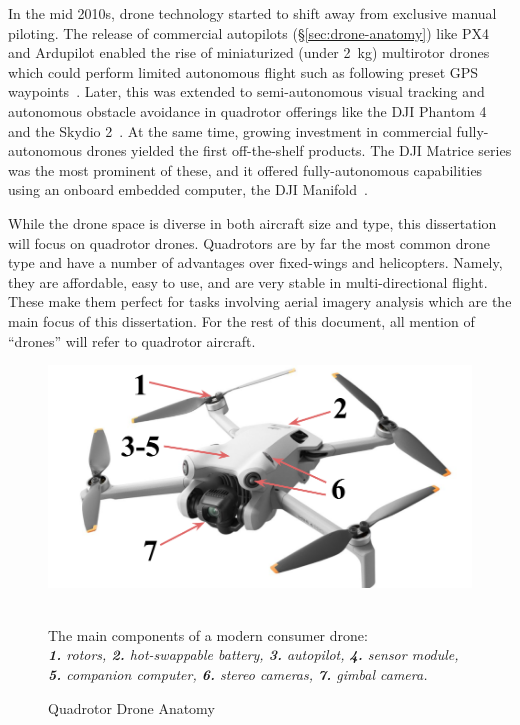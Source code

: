 In the mid 2010s, drone technology started to shift away from exclusive manual piloting. The release of commercial autopilots (\S\ref{sec:drone-anatomy}) like PX4 and Ardupilot enabled the rise of miniaturized (under 2~kg) multirotor drones which could perform limited autonomous flight such as following preset GPS waypoints~\cite{PX4,Ardupilot}. Later, this was extended to semi-autonomous visual tracking and autonomous obstacle avoidance in quadrotor offerings like the DJI Phantom 4 and the Skydio 2~\cite{DJIPhantom4,Skydio2}. At the same time, growing investment in commercial fully-autonomous drones yielded the first off-the-shelf products. The DJI Matrice series was the most prominent of these, and it offered fully-autonomous capabilities using an onboard embedded computer, the DJI Manifold~\cite{DJIMatrice}.

While the drone space is diverse in both aircraft size and type, this dissertation will focus on quadrotor drones. Quadrotors are by far the most common drone type and have a number of advantages over fixed-wings and helicopters. Namely, they are affordable, easy to use, and are very stable in multi-directional flight. These make them perfect for tasks involving aerial imagery analysis which are the main focus of this dissertation. For the rest of this document, all mention of ``drones'' will refer to quadrotor aircraft.

\begin{figure}
    \centering
    \includegraphics[width=0.75\linewidth]{chapter2/FIGS/anatomy.png}
    \begin{captext}
    \small \\ The main components of a modern consumer drone: \\\textit{\textbf{1.} rotors, \textbf{2.} hot-swappable battery, \textbf{3.} autopilot, \textbf{4.} sensor module, \\ \textbf{5.} companion computer, \textbf{6.} stereo cameras, \textbf{7.} gimbal camera.}
    \end{captext}
    \caption{Quadrotor Drone Anatomy~\cite{DJIMini4}}
    \label{fig:drone-anatomy}
\end{figure}

